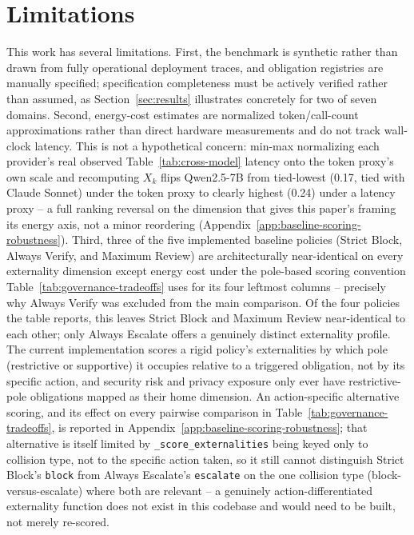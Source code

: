 \documentclass[letterpaper]{article} %
\begin{document}
\section{Limitations}
This work has several limitations.
First, the benchmark is synthetic rather than drawn from fully operational deployment traces, and obligation registries are manually specified; specification completeness must be actively verified rather than assumed, as Section~\ref{sec:results} illustrates concretely for two of seven domains.
Second, energy-cost estimates are normalized token/call-count approximations rather than direct hardware measurements and do not track wall-clock latency. This is not a hypothetical concern: min-max normalizing each provider's real observed Table~\ref{tab:cross-model} latency onto the token proxy's own scale and recomputing $X_k$ flips Qwen2.5-7B from tied-lowest (0.17, tied with Claude Sonnet) under the token proxy to clearly highest (0.24) under a latency proxy -- a full ranking reversal on the dimension that gives this paper's framing its energy axis, not a minor reordering (Appendix~\ref{app:baseline-scoring-robustness}).
Third, three of the five implemented baseline policies (Strict Block, Always Verify, and Maximum Review) are architecturally near-identical on every externality dimension except energy cost under the pole-based scoring convention Table~\ref{tab:governance-tradeoffs} uses for its four leftmost columns -- precisely why Always Verify was excluded from the main comparison. Of the four policies the table reports, this leaves Strict Block and Maximum Review near-identical to each other; only Always Escalate offers a genuinely distinct externality profile. The current implementation scores a rigid policy's externalities by which pole (restrictive or supportive) it occupies relative to a triggered obligation, not by its specific action, and security risk and privacy exposure only ever have restrictive-pole obligations mapped as their home dimension. An action-specific alternative scoring, and its effect on every pairwise comparison in Table~\ref{tab:governance-tradeoffs}, is reported in Appendix~\ref{app:baseline-scoring-robustness}; that alternative is itself limited by \texttt{\_score\_externalities} being keyed only to collision type, not to the specific action taken, so it still cannot distinguish Strict Block's \texttt{block} from Always Escalate's \texttt{escalate} on the one collision type (block-versus-escalate) where both are relevant -- a genuinely action-differentiated externality function does not exist in this codebase and would need to be built, not merely re-scored.
\end{document}
